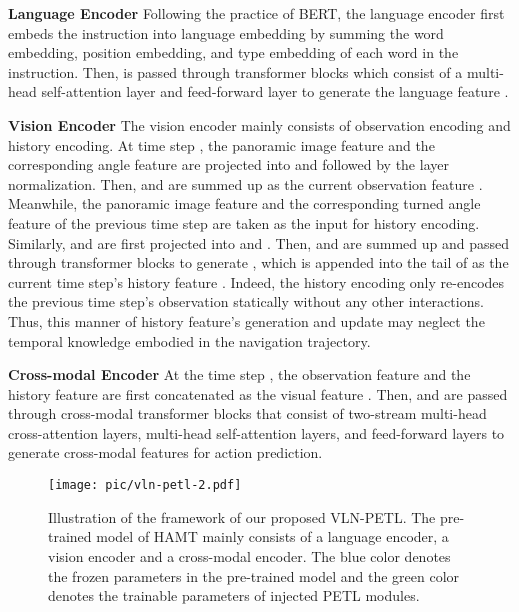 \documentclass[10pt,twocolumn,letterpaper]{article}
\begin{document}
\noindent\textbf{Language Encoder} Following the practice of BERT, the language encoder first embeds the instruction  into language embedding  by summing the word embedding, position embedding, and type embedding of each word  in the instruction. Then,  is passed through  transformer blocks which consist of a multi-head self-attention layer and feed-forward layer to generate the language feature .




\noindent\textbf{Vision Encoder} 
The vision encoder mainly consists of observation encoding and history encoding. At time step , the panoramic image feature  and the corresponding angle feature  are projected into  and  followed by the layer normalization. Then,  and  are summed up as the current observation feature . Meanwhile, the panoramic image feature  and the corresponding turned angle feature  of the previous time step are taken as the input for history encoding. Similarly,  and  are first projected into  and . Then,  and  are summed up and passed through  transformer blocks to generate , which is appended into the tail of  as the current time step's history feature . Indeed, the history encoding only re-encodes the previous time step's observation statically without any other interactions. Thus, this manner of history feature's generation and update may neglect the temporal knowledge embodied in the navigation trajectory. 


\noindent\textbf{Cross-modal Encoder}
At the time step , the observation feature  and the history feature 
are first concatenated as the visual feature . Then,  and  are passed through  cross-modal transformer blocks that consist of two-stream multi-head cross-attention layers, multi-head self-attention layers, and feed-forward layers to generate cross-modal features for action prediction.


\begin{figure}[!t]
	\begin{center}
		\texttt{[image: pic/vln-petl-2.pdf]}
	\end{center}
	\vspace{-15pt}
	\caption{Illustration of the framework of our proposed VLN-PETL. The pre-trained model of HAMT mainly consists of a language encoder, a vision encoder and a cross-modal encoder. The blue color denotes the frozen parameters in the pre-trained model and the green color denotes the trainable parameters of injected PETL modules.}
	\label{fig:vln}
	\vspace{-10pt}
\end{figure}
\end{document}
